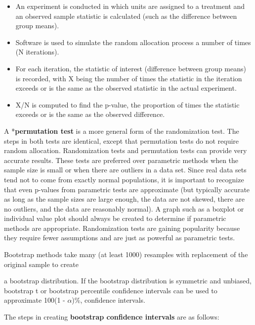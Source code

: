 \documentclass[
]{report}
\providecommand{\tightlist}{%
  \setlength{\itemsep}{0pt}\setlength{\parskip}{0pt}}
\theoremstyle{definition}
\theoremstyle{definition}
\theoremstyle{definition}
\theoremstyle{definition}
\theoremstyle{remark}
\begin{document}
\begin{itemize}
\tightlist
\item
  An experiment is conducted in which units are assigned to a treatment and an observed sample statistic is calculated (such as the difference between group means).
\item
  Software is used to simulate the random allocation process a number of times (N iterations).
\item
  For each iteration, the statistic of interest (difference between group means) is recorded, with X being
  the number of times the statistic in the iteration exceeds or is the same as the observed statistic in the
  actual experiment.
\item
  X/N is computed to find the p-value, the proportion of times the statistic exceeds or is the same as the
  observed difference.
\end{itemize}

A *\textbf{permutation test} is a more general form of the randomization test. The steps in both tests are identical, except that permutation tests do not require random allocation. Randomization tests and permutation tests can provide very accurate results. These tests are preferred over parametric methods when the sample size is small or when there are outliers in a data set. Since real data sets tend not to come from exactly normal populations, it is important to recognize that even p-values from parametric tests are approximate (but typically accurate as long as the sample sizes are large enough, the data are not skewed, there are no outliers, and the data are reasonably normal). A graph such as a boxplot or individual value plot should always be created to determine if parametric methods are appropriate. Randomization tests are gaining popularity because they require fewer assumptions and are just as powerful as parametric tests.

Bootstrap methods take many (at least 1000) resamples with replacement of the original sample to create

a bootstrap distribution. If the bootstrap distribution is symmetric and unbiased, bootstrap t or bootstrap
percentile confidence intervals can be used to approximate 100(1 - \(\alpha\))\%, confidence intervals.

The steps in creating \textbf{bootstrap confidence intervals} are as follows:
\end{document}
